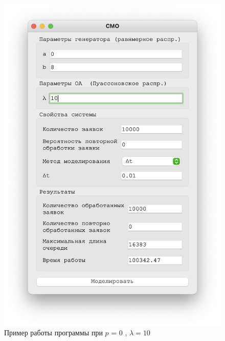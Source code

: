 \begin{figure}[!htb]
\begin{minipage}{0.55\textwidth}
      \includegraphics[width=1\linewidth]{10-0-t}
    \end{minipage}
    \caption{Пример работы программы при $p$ = 0 , $\lambda = 10$}
 \end{figure}


